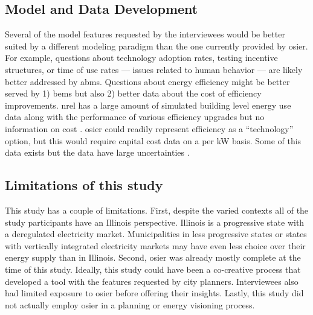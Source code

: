 \subsection{Model and Data Development}
Several of the model features requested by the interviewees would be better
suited by a different modeling paradigm than the one currently provided by
\ac{osier}. For example, questions about technology adoption rates, testing
incentive structures, or time of use rates --- issues related to human behavior
--- are likely better addressed by \acp{abm}. Questions about energy efficiency
might be better served by 1) \acp{bem} but also 2) better data about the cost of
efficiency improvements. \ac{nrel} has a large amount of simulated building
level energy use data along with the performance of various efficiency upgrades
but no information on cost \cite{wilson_end-use_2022}. \ac{osier} could readily
represent efficiency as a ``technology'' option, but this would require capital
cost data on a per kW basis. Some of this data exists but
the data have large uncertainties \cite{less_cost_2021}.


\subsection{Limitations of this study}
This study has a couple of limitations. First, despite the varied contexts all
of the study participants have an Illinois perspective. Illinois is a
progressive state with a deregulated electricity market. Municipalities in less
progressive states or states with vertically integrated electricity markets may
have even less choice over their energy supply than in Illinois. Second,
\ac{osier} was already mostly complete at the time of this study. Ideally, this
study could have been a co-creative process that developed a tool with the
features requested by city planners. Interviewees also had limited exposure to
\ac{osier} before offering their insights. Lastly, this study did not actually
employ \ac{osier} in a planning or energy visioning process.